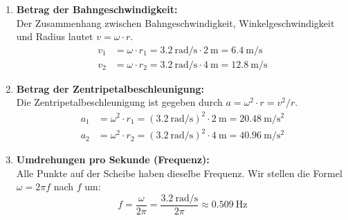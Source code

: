 \documentclass[ngerman]{scrreprt}
\newenvironment{loesungbox}[1]
  {\needspace{5\baselineskip}\begin{loesungboxstyle}[frametitle={#1}]}
  {\end{loesungboxstyle}}
\begin{document}
\begin{loesungbox}{Lösung zu \Cref{aufg:winkelgeschwindigkeit}}
\begin{enumerate}
    \item \textbf{Betrag der Bahngeschwindigkeit:} \\
    Der Zusammenhang zwischen Bahngeschwindigkeit, Winkelgeschwindigkeit und Radius lautet $v = \omega \cdot r$. 
    \begin{align}
        v_1 &= \omega \cdot r_1 = \SI{3.2}{\radian\per\second} \cdot \SI{2}{\meter} = \SI{6.4}{\meter\per\second} \\ 
        v_2 &= \omega \cdot r_2 = \SI{3.2}{\radian\per\second} \cdot \SI{4}{\meter} = \SI{12.8}{\meter\per\second} 
    \end{align}
    
    \item \textbf{Betrag der Zentripetalbeschleunigung:} \\
    Die Zentripetalbeschleunigung ist gegeben durch $a = \omega^2 \cdot r = v^2/r$. 
    \begin{align}
        a_1 &= \omega^2 \cdot r_1 = \left(\SI{3.2}{\radian\per\second}\right)^2 \cdot \SI{2}{\meter} = \SI{20.48}{\meter\per\second\squared} \\ 
        a_2 &= \omega^2 \cdot r_2 = \left(\SI{3.2}{\radian\per\second}\right)^2 \cdot \SI{4}{\meter} = \SI{40.96}{\meter\per\second\squared} 
    \end{align}
    
    \item \textbf{Umdrehungen pro Sekunde (Frequenz):} \\
    Alle Punkte auf der Scheibe haben dieselbe Frequenz. Wir stellen die Formel $\omega = 2\pi f$ nach $f$ um:
    \begin{equation}
        f = \frac{\omega}{2\pi} = \frac{\SI{3.2}{\radian\per\second}}{2\pi} \approx \SI{0.509}{\hertz}
    \end{equation}
    

\end{enumerate}
\end{loesungbox}
\end{document}

